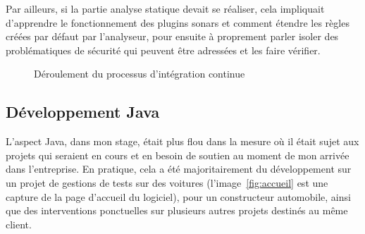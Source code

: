 Par ailleurs, si la partie analyse statique devait se réaliser, cela impliquait d'apprendre le fonctionnement des plugins sonars et comment étendre les règles créées par défaut par l'analyseur, pour ensuite à proprement parler isoler des problématiques de sécurité qui peuvent être adressées et les faire vérifier.

\begin{figure}
	\centering
	\caption{Déroulement du processus d'intégration continue}
	\label{fig:ci_flow}
\end{figure}

\subsection{Développement Java}
L'aspect Java, dans mon stage, était plus flou dans la mesure où il était sujet aux projets qui seraient en cours et en besoin de soutien au moment de mon arrivée dans l'entreprise. En pratique, cela a été majoritairement du développement sur un projet de gestions de tests sur des voitures (l'image~\ref{fig:accueil} est une capture de la page d'accueil du logiciel), pour un constructeur automobile, ainsi que des interventions ponctuelles sur plusieurs autres projets destinés au même client.

